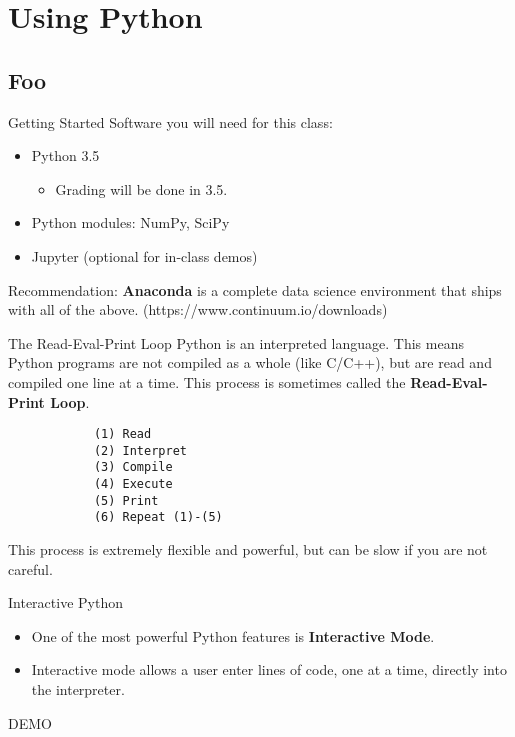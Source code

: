 \documentclass[serif,xcolor=pdftex,dvipsnames,table,hyperref={bookmarks=false,breaklinks}]{beamer}
\begin{document}
\section{Using Python}
\subsection{Foo}

\begin{frame}[t]{Getting Started}
	Software you will need for this class:
	\begin{itemize}[<+->]
		\item Python 3.5
		\begin{itemize}[<+->]
			\item Grading will be done in 3.5.
		\end{itemize}
		\item Python modules: NumPy, SciPy
		\item Jupyter (optional for in-class demos)
	\end{itemize}
	\pause
	Recommendation: \textbf{Anaconda} is a complete data science environment that ships with all of the above. (https://www.continuum.io/downloads)
\end{frame}

\begin{frame}[t,fragile]{The Read-Eval-Print Loop}
	Python is an interpreted language. This means Python programs are not compiled as a whole (like C/C++), but are read and compiled one line at a time. This process is sometimes called the \textbf{Read-Eval-Print Loop}.
	
\pause
	\begin{tcolorbox}
		\begin{verbatim}
			(1) Read
			(2) Interpret
			(3) Compile
			(4) Execute
			(5) Print
			(6) Repeat (1)-(5)
		\end{verbatim}
	\end{tcolorbox}

\pause	
This process is extremely flexible and powerful, but can be slow if you are not careful.

\end{frame}

\begin{frame}[t]{Interactive Python}
	\begin{itemize}[<+->]
	
		\item One of the most powerful Python features is \textbf{Interactive Mode}.
		\item Interactive mode allows a user enter lines of code, one at a time, directly into the interpreter.
	\end{itemize}
	\pause
	\center
	\Huge{DEMO}

\end{frame}
\end{document}

